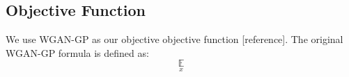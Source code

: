\subsection{Objective Function}
We use WGAN-GP as our objective objective function [reference]. The original WGAN-GP formula is defined as:
\begin{equation}
\underset{x }{\mathbb{E}}
\end{equation}